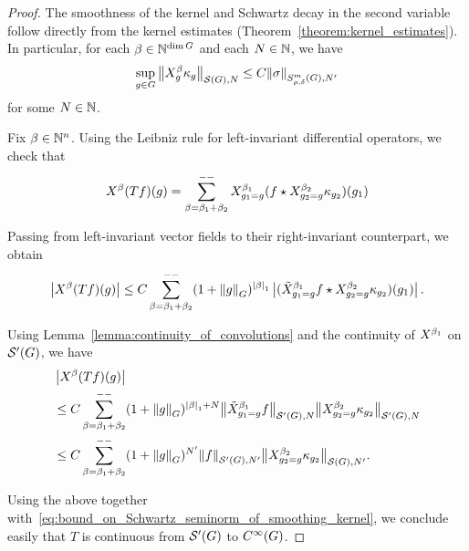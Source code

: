 \begin{proof}
    The smoothness of the kernel and Schwartz decay in the second variable follow directly from the kernel estimates (Theorem~\ref{theorem:kernel_estimates}).
    In particular,
    for each $\beta \in \mathbb{N}^{\dim G}$ and each $N \in \mathbb{N}$,
    we have
    \begin{align}
        \sup_{g \in \Group}
        \seminorm [\Schwartz \Group] N {\LeftDifferentialOperator [g] \beta \kappa_g}
        \leq
        C
        \SymbolSemiNorm m {\rho, \delta} {N'} {\sigma}
        \label{eq:bound_on_Schwartz_seminorm_of_smoothing_kernel}
    \end{align}
    for some $N \in \mathbb{N}$.

    Fix $\beta \in \mathbb{N}^n$.
    Using the Leibniz rule for left-invariant differential operators,
    we check that
    \begin{align*}
        \LeftDifferentialOperator \beta (T f)(g)
        = \lcsum{\beta = \beta_1 + \beta_2}
        \LeftDifferentialOperator [g_1 = g] {\beta_1}
        (\conv f {\LeftDifferentialOperator [g_2 = g] {\beta_2} \kappa_{g_2}})(g_1)
    \end{align*}

    Passing from left-invariant vector fields to their right-invariant counterpart,
    we obtain
    \begin{align*}
        \abs {\LeftDifferentialOperator \beta (T f)(g)}
        \leq
        C
        \lcsum{\beta = \beta_1 + \beta_2}
        (1 + \norm [\Group] g)^{\abs \beta_1}
        \abs {(\conv {\RightDifferentialOperator [g_1 = g] {\beta_1} f} {\LeftDifferentialOperator [g_2 = g] {\beta_2} \kappa_{g_2}})(g_1)}.
    \end{align*}

    Using Lemma~\ref{lemma:continuity_of_convolutions} and the continuity of $\LeftDifferentialOperator {\beta_1}$ on ${\mathcal{S}' (G)}$,
    we have
    \begin{align*}
        &\abs {\LeftDifferentialOperator \beta (T f)(g)}\\
        &\leq
        C
        \lcsum{\beta = \beta_1 + \beta_2}
        (1 + \norm [\Group] g)^{\abs \beta_1 + N}
        \seminorm [\TemperedDistributions \Group] N {\RightDifferentialOperator [g_1 = g] {\beta_1} f}
        \seminorm [\TemperedDistributions \Group] N {\LeftDifferentialOperator [g_2 = g] {\beta_2} \kappa_{g_2}}\\
        &\leq
        C
        \lcsum{\beta = \beta_1 + \beta_2}
        (1 + \norm [\Group] g)^{N'}
        \seminorm [\TemperedDistributions \Group] {N'} f
        \seminorm [\Schwartz \Group] {N'} {\LeftDifferentialOperator [g_2 = g] {\beta_2} \kappa_{g_2}}.
    \end{align*}

    Using the above together with~\eqref{eq:bound_on_Schwartz_seminorm_of_smoothing_kernel},
    we conclude easily that $T$ is continuous from ${\mathcal{S}' (G)}$ to ${C^\infty(G)}$.
\end{proof}

